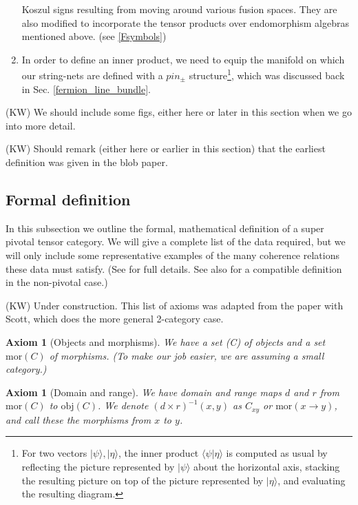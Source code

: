 \documentclass[12pt,a4paper]{article}
\newtheorem{axiom}[theorem]{Axiom}
\newcommand{\mor}{\text{mor}}
\newcommand{\obj}{\text{obj}}
\newcommand{\kw}[1]{{\color{kwcolor}\footnotesize{(KW) #1}}}
\begin{document}
\begin{enumerate}
	 Koszul signs resulting from moving around various fusion spaces. 
	 They are also modified to incorporate the tensor products over endomorphism algebras mentioned above. (see \ref{Fsymbols})
	\item In order to define an inner product, we need to equip the manifold on which our string-nets are defined with a $pin_\pm$ structure\footnote{For two vectors $|\psi\rangle,|\eta\rangle$, the inner product $\langle \psi | \eta \rangle$ is computed as usual by reflecting the picture represented by $|\psi\rangle$ about the horizontal axis, stacking the resulting picture on top of the picture represented by $|\eta\rangle$, and evaluating the resulting diagram.}, which was discussed back in Sec. \ref{fermion_line_bundle}.
\end{enumerate}

\kw{We should include some figs, either here or later in this section when we go into more detail.}

\kw{Should remark (either here or earlier in this section) that the earliest definition was given in the blob paper.}



\subsection{Formal definition}

In this subsection we outline the formal, mathematical definition of a super pivotal tensor category.
We will give a complete list of the data required, but we will only include some representative
examples of the many coherence relations these data must satisfy.
(See \cite{MW-in-prep} for full details.  See also \cite{xxxx} for a compatible definition in the non-pivotal case.)



\kw{Under construction.
This list of axioms was adapted from the paper with Scott, which does the more general
2-category case.}

\begin{axiom}[Objects and morphisms]
We have a set \obj(C) of objects and a set $\mor(C)$ of morphisms.
(To make our job easier, we are assuming a small category.)
\end{axiom}

\begin{axiom}[Domain and range]
We have domain and range maps $d$ and $r$ from $\mor(C)$ to $\obj(C)$.
We denote $(d \times r)^{-1}(x, y)$ as $C_{xy}$ or $\mor(x \to y)$, and call these
the morphisms from $x$ to $y$.
\end{axiom}
\end{document}
